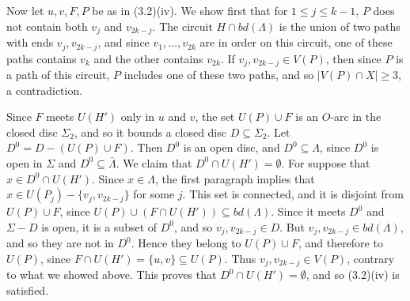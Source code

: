 {Now let $u, v, F, P$ be as in (3.2)(iv). We show first that for $1 \le j \le k-1$, $P$ does not contain both $v_j$ and $v_{2k-j}$. The circuit $H \cap bd(\Lambda)$ is the union of two paths with ends $v_j, v_{2k-j}$, and since $v_1, \dots, v_{2k}$ are in order on this circuit, one of these paths contains $v_k$ and the other contains $v_{2k}$. If $v_j, v_{2k-j} \in V(P)$, then since $P$ is a path of this circuit, $P$ includes one of these two paths, and so $|V(P) \cap X| \ge 3$, a contradiction.

Since $F$ meets $U(H')$ only in $u$ and $v$, the set $U(P) \cup F$ is an $O$-arc in the closed disc $\Sigma_2$, and so it bounds a closed disc $D \subseteq \Sigma_2$. Let $D^0 = D - (U(P) \cup F)$. Then $D^0$ is an open disc, and $D^0 \subseteq \Lambda$, since $D^0$ is open in $\Sigma$ and $D^0 \subseteq \bar{\Lambda}$. We claim that $D^0 \cap U(H') = \emptyset$. For suppose that $x \in D^0 \cap U(H')$. Since $x \in \Lambda$, the first paragraph implies that $x \in U(P_j) - \{v_j, v_{2k-j}\}$ for some $j$. This set is connected, and it is disjoint from $U(P) \cup F$, since $U(P) \cup (F \cap U(H')) \subseteq bd(\Lambda)$. Since it meets $D^0$ and $\Sigma - D$ is open, it is a subset of $D^0$, and so $v_j, v_{2k-j} \in D$. But $v_j, v_{2k-j} \in bd(\Lambda)$, and so they are not in $D^0$. Hence they belong to $U(P) \cup F$, and therefore to $U(P)$, since $F \cap U(H') = \{u, v\} \subseteq U(P)$. Thus $v_j, v_{2k-j} \in V(P)$, contrary to what we showed above. This proves that $D^0 \cap U(H') = \emptyset$, and so (3.2)(iv) is satisfied.}

